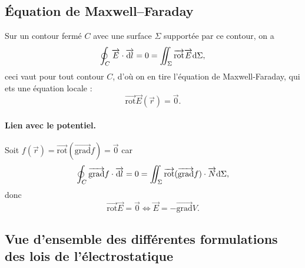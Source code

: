     \subsection{Équation de Maxwell--Faraday}

        Sur un contour fermé $C$ avec une surface $\Sigma$ supportée par ce contour, on a 
        \begin{equation}
            \oint_{C}\protect\overrightarrow{{E}}\cdot\protect\overrightarrow{{\mathrm{d} l}}=0=\iint_{\Sigma}\protect\overrightarrow{{\mathrm{rot}}}\protect\overrightarrow{{E}}\mathrm{d}\Sigma,
        \end{equation}
        ceci vaut pour tout contour $C$, d'où on en tire l'équation de Maxwell-Faraday, qui ets une équation locale :
        \begin{equation}
            \boxed{
                \vec{\mathrm{rot}}\vec{E}(\vec{r})=\vec{0}.
            }
        \end{equation}

        \paragraph{Lien avec le potentiel.}

            Soit $f(\vec{r})=\vec{\mathrm{rot}}(\vec{\mathrm{grad}}f)=\vec{0}$ car
            \begin{equation}
                \oint_{C}\protect\overrightarrow{{\mathrm{grad}}}f\cdot\protect\overrightarrow{{\mathrm{d} l}}=0=\iint_{\Sigma}\protect\overrightarrow{{\mathrm{rot}}}(\protect\overrightarrow{{\mathrm{grad}}}f)\cdot\protect\overrightarrow{{N}}\mathrm{d}\Sigma,
            \end{equation}
            donc
            \begin{equation}
                \boxed{
                    \vec{\mathrm{rot}}\vec{E}=\vec{0}\Longleftrightarrow\vec{E}=-\vec{\mathrm{grad}}V.
                }
            \end{equation}

    \subsection{Vue d'ensemble des différentes formulations des lois de l'électrostatique}

